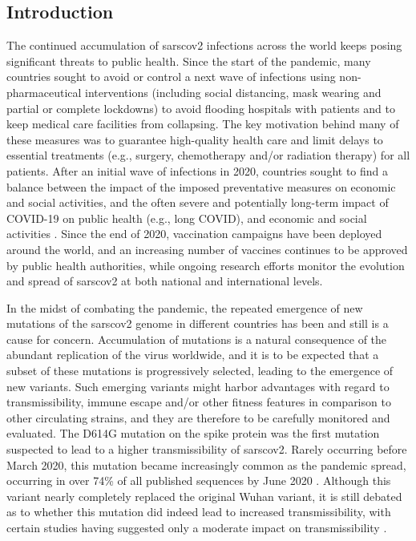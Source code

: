 \subsection{Introduction}
The continued accumulation of \gls{sarscov2} infections across the world keeps posing significant threats to public health.
Since the start of the pandemic, many countries sought to avoid or control a next wave of infections using non-pharmaceutical interventions (including social distancing, mask wearing and partial or complete lockdowns) to avoid flooding hospitals with patients and to keep medical care facilities from collapsing.
The key motivation behind many of these measures was to guarantee high-quality health care and limit delays to essential treatments (e.g., surgery, chemotherapy and/or radiation therapy) for all patients.
After an initial wave of infections in 2020, countries sought to find a balance between the impact of the imposed preventative measures on economic and social activities, and the often severe and potentially long-term impact of COVID-19 on public health (e.g., long COVID), and economic and social activities \citep{zivin2020spread}.
Since the end of 2020, vaccination campaigns have been deployed around the world, and an increasing number of vaccines continues to be approved by public health authorities, while ongoing research efforts monitor the evolution and spread of \gls{sarscov2} at both national and international levels.

In the midst of combating the pandemic, the repeated emergence of new mutations of the \gls{sarscov2} genome in different countries has been and still is a cause for concern.
Accumulation of mutations is a natural consequence of the abundant replication of the virus worldwide, and it is to be expected that a subset of these mutations is progressively selected, leading to the emergence of new variants.
Such emerging variants might harbor advantages with regard to transmissibility, immune escape and/or other fitness features in comparison to other circulating strains, and they are therefore to be carefully monitored and evaluated.
The D614G mutation on the spike protein was the first mutation suspected to lead to a higher transmissibility of \gls{sarscov2}.
Rarely occurring before March 2020, this mutation became increasingly common as the pandemic spread, occurring in over 74\% of all published sequences by June 2020 \citep{korber2020tracking,plante2021spike}.
Although this variant nearly completely replaced the original Wuhan variant, it is still debated as to whether this mutation did indeed lead to increased transmissibility, with certain studies having suggested only a moderate impact on transmissibility \citep{cogUKreport1,volz2021evaluating}.

